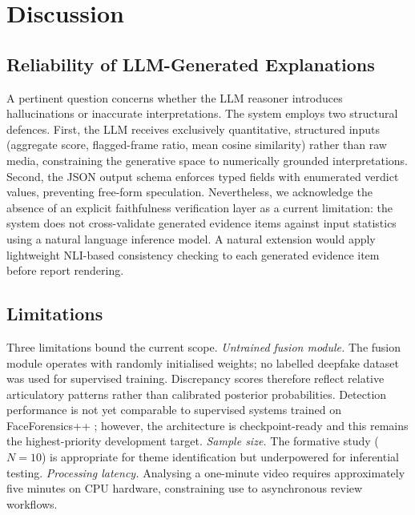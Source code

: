 \documentclass[12pt]{article}
\begin{document}
\section{Discussion}

\subsection{Reliability of LLM-Generated Explanations}

A pertinent question concerns whether the LLM reasoner introduces hallucinations
or inaccurate interpretations.
The system employs two structural defences.
First, the LLM receives exclusively quantitative, structured inputs (aggregate
score, flagged-frame ratio, mean cosine similarity) rather than raw media,
constraining the generative space to numerically grounded interpretations.
Second, the JSON output schema enforces typed fields with enumerated verdict
values, preventing free-form speculation.
Nevertheless, we acknowledge the absence of an explicit faithfulness
verification layer as a current limitation: the system does not cross-validate
generated evidence items against input statistics using a natural language
inference model.
A natural extension would apply lightweight NLI-based consistency checking
\citep{abercrombie2024} to each generated evidence item before report rendering.

\subsection{Limitations}

Three limitations bound the current scope.
\textit{Untrained fusion module.}
The fusion module operates with randomly initialised weights; no labelled
deepfake dataset was used for supervised training.
Discrepancy scores therefore reflect relative articulatory patterns rather than
calibrated posterior probabilities.
Detection performance is not yet comparable to supervised systems trained on
FaceForensics++ \citep{rossler2019}; however, the architecture is checkpoint-ready
and this remains the highest-priority development target.
\textit{Sample size.}
The formative study ($N = 10$) is appropriate for theme identification but
underpowered for inferential testing.
\textit{Processing latency.}
Analysing a one-minute video requires approximately five minutes on CPU hardware,
constraining use to asynchronous review workflows.
\end{document}
